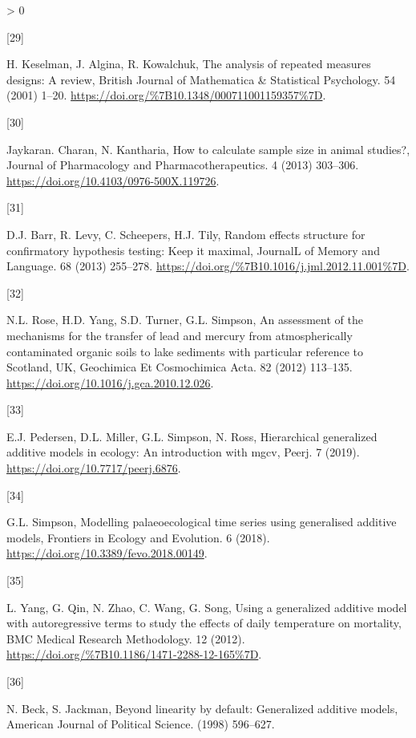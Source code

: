 \documentclass[
]{article}
\newlength{\cslhangindent}
\newlength{\csllabelwidth}
\newenvironment{CSLReferences}[2] %
 {%
  \setlength{\parindent}{0pt}
  \ifodd #1 \everypar{\setlength{\hangindent}{\cslhangindent}}\ignorespaces\fi
  \ifnum #2 > 0
  \setlength{\parskip}{#2\baselineskip}
  \fi
 }%
 {}
\newcommand{\CSLLeftMargin}[1]{\parbox[t]{\csllabelwidth}{#1}}
\newcommand{\CSLRightInline}[1]{\parbox[t]{\linewidth - \csllabelwidth}{#1}\break}
\begin{document}
\begin{CSLReferences}{0}{0}
\leavevmode\hypertarget{ref-keselman2001}{}%
\CSLLeftMargin{{[}29{]} }
\CSLRightInline{H. Keselman, J. Algina, R. Kowalchuk, {The analysis of repeated measures designs: A review}, {British Journal of Mathematica \& Statistical Psychology}. {54} (2001) 1--20. \url{https://doi.org/\%7B10.1348/000711001159357\%7D}.}

\leavevmode\hypertarget{ref-charan2013}{}%
\CSLLeftMargin{{[}30{]} }
\CSLRightInline{Jaykaran. Charan, N. Kantharia, {How to calculate sample size in animal studies?}, Journal of Pharmacology and Pharmacotherapeutics. 4 (2013) 303--306. \url{https://doi.org/10.4103/0976-500X.119726}.}

\leavevmode\hypertarget{ref-barr2013}{}%
\CSLLeftMargin{{[}31{]} }
\CSLRightInline{D.J. Barr, R. Levy, C. Scheepers, H.J. Tily, {Random effects structure for confirmatory hypothesis testing: Keep it maximal}, {JournalL of Memory and Language}. {68} (2013) 255--278. \url{https://doi.org/\%7B10.1016/j.jml.2012.11.001\%7D}.}

\leavevmode\hypertarget{ref-rose2012}{}%
\CSLLeftMargin{{[}32{]} }
\CSLRightInline{N.L. Rose, H.D. Yang, S.D. Turner, G.L. Simpson, {An assessment of the mechanisms for the transfer of lead and mercury from atmospherically contaminated organic soils to lake sediments with particular reference to Scotland, UK}, Geochimica Et Cosmochimica Acta. 82 (2012) 113--135. \url{https://doi.org/10.1016/j.gca.2010.12.026}.}

\leavevmode\hypertarget{ref-pedersen2019}{}%
\CSLLeftMargin{{[}33{]} }
\CSLRightInline{E.J. Pedersen, D.L. Miller, G.L. Simpson, N. Ross, Hierarchical generalized additive models in ecology: An introduction with mgcv, Peerj. 7 (2019). \url{https://doi.org/10.7717/peerj.6876}.}

\leavevmode\hypertarget{ref-simpson2018}{}%
\CSLLeftMargin{{[}34{]} }
\CSLRightInline{G.L. Simpson, Modelling palaeoecological time series using generalised additive models, Frontiers in Ecology and Evolution. 6 (2018). \url{https://doi.org/10.3389/fevo.2018.00149}.}

\leavevmode\hypertarget{ref-yang2012}{}%
\CSLLeftMargin{{[}35{]} }
\CSLRightInline{L. Yang, G. Qin, N. Zhao, C. Wang, G. Song, {Using a generalized additive model with autoregressive terms to study the effects of daily temperature on mortality}, {BMC Medical Research Methodology}. {12} (2012). \url{https://doi.org/\%7B10.1186/1471-2288-12-165\%7D}.}

\leavevmode\hypertarget{ref-beck1998}{}%
\CSLLeftMargin{{[}36{]} }
\CSLRightInline{N. Beck, S. Jackman, Beyond linearity by default: Generalized additive models, American Journal of Political Science. (1998) 596--627.}


\end{CSLReferences}
\end{document}
